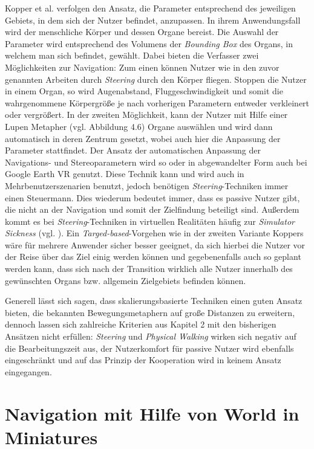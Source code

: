 Kopper et al. \cite{Kopper2006DesignEnvironments} verfolgen den Ansatz, die Parameter entsprechend des jeweiligen Gebiets, in dem sich der Nutzer befindet, anzupassen. In ihrem Anwendungsfall wird der menschliche Körper und dessen Organe bereist. Die Auswahl der Parameter wird entsprechend des Volumens der \textit{Bounding Box} des Organs, in welchem man sich befindet, gewählt. Dabei bieten die Verfasser zwei Möglichkeiten zur Navigation: Zum einen können Nutzer wie in den zuvor genannten Arbeiten durch \textit{Steering} durch den Körper fliegen. Stoppen die Nutzer in einem Organ, so wird Augenabstand, Fluggeschwindigkeit und somit die wahrgenommene Körpergröße je nach vorherigen Parametern entweder verkleinert oder vergrößert. In der zweiten Möglichkeit, kann der Nutzer mit Hilfe einer Lupen Metapher (vgl. Abbildung 4.6) Organe auswählen und wird dann automatisch in deren Zentrum gesetzt, wobei auch hier die Anpassung der Parameter stattfindet.
Der Ansatz der automatischen Anpassung der Navigations- und Stereoparametern wird so oder in abgewandelter Form auch bei Google Earth VR genutzt. Diese Technik kann und wird auch in Mehrbenutzerszenarien benutzt, jedoch benötigen \textit{Steering}-Techniken immer einen Steuermann. Dies wiederum bedeutet immer, dass es passive Nutzer gibt, die nicht an der Navigation und somit der Zielfindung beteiligt sind. Außerdem kommt es bei \textit{Steering}-Techniken in virtuellen Realitäten häufig zur \textit{Simulator Sickness} (vgl. \cite{Lackner2014MotionVomiting}).
Ein \textit{Targed-based}-Vorgehen wie in der zweiten Variante Koppers wäre für mehrere Anwender sicher besser geeignet, da sich hierbei die Nutzer vor der Reise über das Ziel einig werden können und gegebenenfalls auch so geplant werden kann, dass sich nach der Transition wirklich alle Nutzer innerhalb des gewünschten Organs bzw. allgemein Zielgebiets befinden können.

Generell lässt sich sagen, dass skalierungsbasierte Techniken einen guten Ansatz bieten, die bekannten Bewegungsmetaphern auf große Distanzen zu erweitern, dennoch lassen sich zahlreiche Kriterien aus Kapitel 2 mit den bisherigen Ansätzen nicht erfüllen:
\textit{Steering} und \textit{Physical Walking} wirken sich negativ auf die Bearbeitungszeit aus, der Nutzerkomfort für passive Nutzer wird ebenfalls eingeschränkt und auf das Prinzip der Kooperation wird in keinem Ansatz eingegangen.

\section{Navigation mit Hilfe von World in Miniatures}

